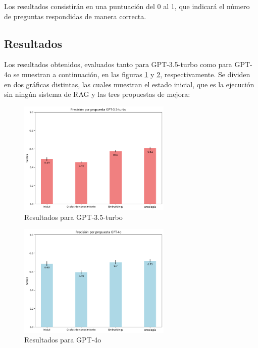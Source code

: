 Los resultados consistirán en una puntuación del 0 al 1, que indicará el número de preguntas respondidas de manera correcta.

\subsection{Resultados}
Los resultados obtenidos, evaluados tanto para GPT-3.5-turbo como para GPT-4o se muestran a continuación, en las figuras \ref{fig:resultados_gpt35} y \ref{fig:resultados_gpt4o}, respectivamente. Se dividen en dos gráficas distintas, las cuales muestran el estado inicial, que es la ejecución sin ningún sistema de RAG y las tres propuestas de mejora:

\begin{figure}[H]
    \centering
    \includegraphics[width=0.65\textwidth]{images/Resultados_gpt35.png}
    \caption{Resultados para GPT-3.5-turbo}
    \label{fig:resultados_gpt35}
\end{figure}

\begin{figure}[H]
    \centering
    \includegraphics[width=0.65\textwidth]{images/Resultados_gpt4o.png}
    \caption{Resultados para GPT-4o}
    \label{fig:resultados_gpt4o}
\end{figure}

